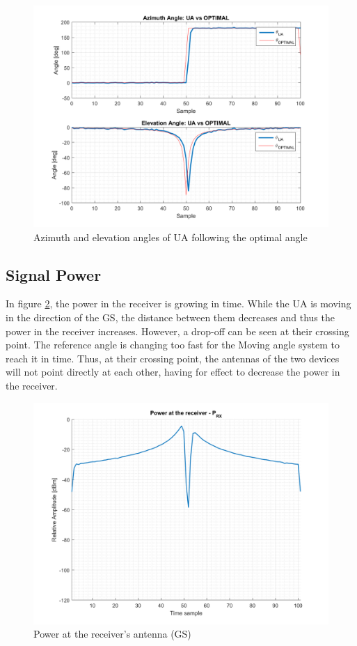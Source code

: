 \begin{figure}[H]
	\centering
	\includegraphics[scale=0.8]{figures/s3_ua.png}
	\caption{Azimuth and elevation angles of UA following the optimal angle}
	\label{fig:s3_ua}
\end{figure}

\subsection*{Signal Power}
In figure \ref{fig:s3_power}, the power in the receiver is growing in time. While the UA is moving in the direction of the GS, the distance between them decreases and thus the power in the receiver increases. However, a drop-off can be seen at their crossing point. The reference angle is changing too fast for the Moving angle system to reach it in time. Thus, at their crossing point, the antennas of the two devices will not point directly at each other, having for effect to decrease the power in the receiver.

\begin{figure}[H]
	\centering
	\includegraphics[scale=0.8]{figures/s3_power.png}
	\caption{Power at the receiver's antenna (GS)}
	\label{fig:s3_power}
\end{figure}